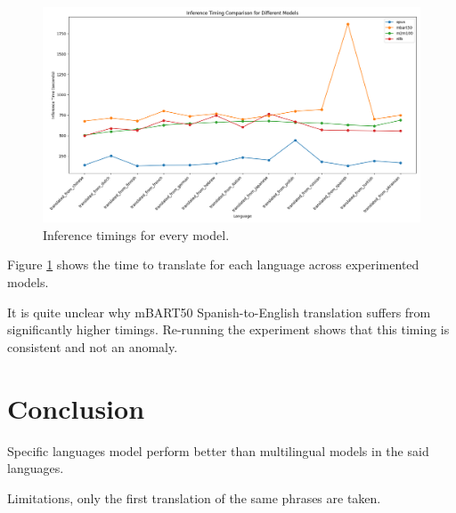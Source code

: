 \documentclass[a4paper]{article}
\begin{document}
\begin{figure}[htbp]
    \centering
    \includegraphics[width=0.9\linewidth]{figures/inference_timings.png}
    \caption{Inference timings for every model.}
    \label{fig:inference_timings}
\end{figure}

Figure \ref{fig:inference_timings} shows the time to translate for each language across experimented models.

It is quite unclear why mBART50 Spanish-to-English translation suffers from significantly higher timings. Re-running the experiment shows that this timing is consistent and not an anomaly.

\section{Conclusion}

Specific languages model perform better than multilingual models in the said languages.

Limitations, only the first translation of the same phrases are taken.


\printbibliography
\end{document}
